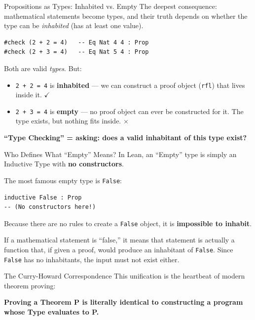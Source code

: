 \documentclass[10pt,aspectratio=169]{beamer}
\begin{document}
\begin{frame}[fragile]{Propositions as Types: Inhabited vs. Empty}
    The deepest consequence: mathematical statements become types, and their truth depends on whether the type can be \textit{inhabited} (has at least one value).
    
    \begin{lstlisting}[language={}]
#check (2 + 2 = 4)   -- Eq Nat 4 4 : Prop
#check (2 + 3 = 4)   -- Eq Nat 5 4 : Prop
    \end{lstlisting}
    
    Both are valid \textit{types}. But:
    \begin{itemize}
        \item \verb|2 + 2 = 4| is \textbf{inhabited} — we can construct a proof object (\verb|rfl|) that lives inside it. $\checkmark$
        \item \verb|2 + 3 = 4| is \textbf{empty} — no proof object can ever be constructed for it. The type exists, but nothing fits inside. $\times$
    \end{itemize}
    
    \vspace{0.5em}
    \textbf{``Type Checking'' = asking: does a valid inhabitant of this type exist?}
\end{frame}

\begin{frame}[fragile]{Who Defines What ``Empty'' Means?}
    In Lean, an ``Empty'' type is simply an Inductive Type with \textbf{no constructors}.
    
    \vspace{0.5em}
    The most famous empty type is \verb|False|:
    
    \begin{lstlisting}[language={}]
inductive False : Prop
-- (No constructors here!)
    \end{lstlisting}
    
    Because there are no rules to create a \verb|False| object, it is \textbf{impossible to inhabit}.
    
    \vspace{0.5em}
    If a mathematical statement is ``false,'' it means that statement is actually a function that, if given a proof, would produce an inhabitant of \verb|False|. Since \verb|False| has no inhabitants, the input must not exist either.
\end{frame}

\begin{frame}[fragile]{The Curry-Howard Correspondence}
    This unification is the heartbeat of modern theorem proving:
    
    \vspace{1em}
    \begin{center}
        \Large \textbf{Proving a Theorem P is literally identical to constructing a program whose Type evaluates to P.}
    \end{center}
\end{frame}
\end{document}
